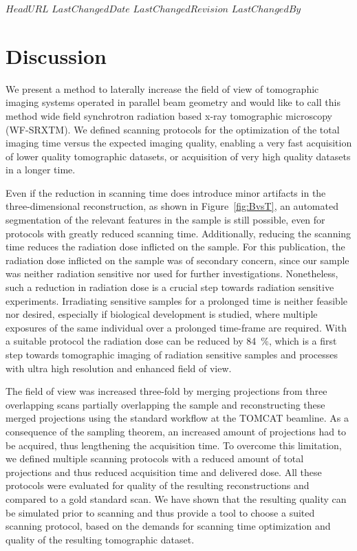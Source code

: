 \svnidlong
{$HeadURL$}
{$LastChangedDate$}
{$LastChangedRevision$}
{$LastChangedBy$}
%
\section{Discussion}\label{sec:Discussion}

We present a method to laterally increase the field of view of tomographic imaging systems operated in parallel beam geometry and would like to call this method wide field synchrotron radiation based x-ray tomographic microscopy (WF-SRXTM). We defined scanning protocols for the optimization of the total imaging time versus the expected imaging quality, enabling a very fast acquisition of lower quality tomographic datasets, or acquisition of very high quality datasets in a longer time.

Even if the reduction in scanning time does introduce minor artifacts in the three-dimensional reconstruction, as shown in Figure~\ref{fig:BvsT}, an automated segmentation of the relevant features in the sample is still possible, even for protocols with greatly reduced scanning time. Additionally, reducing the scanning time reduces the radiation dose inflicted on the sample. For this publication, the radiation dose inflicted on the sample was of secondary concern, since our sample was neither radiation sensitive nor used for further investigations. %
Nonetheless, such a reduction in radiation dose is a crucial step towards radiation sensitive experiments. Irradiating sensitive samples for a prolonged time is neither feasible nor desired, especially if biological development is studied, where multiple exposures of the same individual over a prolonged time-frame are required. With a suitable protocol the radiation dose can be reduced by \SI{84}{\percent}, which is a first step towards tomographic imaging of radiation sensitive samples and processes with ultra high resolution and enhanced field of view.

The field of view was increased three-fold by merging projections from three overlapping scans partially overlapping the sample and reconstructing these merged projections using the standard workflow at the TOMCAT beamline. As a consequence of the sampling theorem, an increased amount of projections had to be acquired, thus lengthening the acquisition time. To overcome this limitation, we defined multiple scanning protocols with a reduced amount of total projections and thus reduced acquisition time and delivered dose. All these protocols were evaluated for quality of the resulting reconstructions and compared to a gold standard scan. We have shown that the resulting quality can be simulated prior to scanning and thus provide a tool to choose a suited scanning protocol, based on the demands for scanning time optimization and quality of the resulting tomographic dataset.

